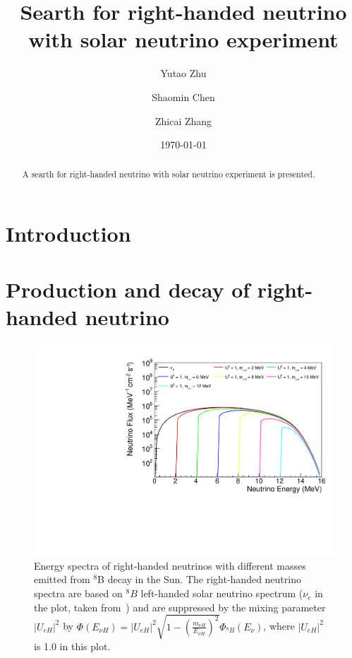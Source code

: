 \documentclass[%
 reprint,
 amsmath,amssymb,
 aps,
 prd,
floatfix,
twocolumn,
]{revtex4-1}
\begin{document}

\title{Searth for right-handed neutrino with solar neutrino experiment}%

\author{Yutao Zhu}
\author{Shaomin Chen}
\author{Zhicai Zhang}%
%

\date{\today}

\begin{abstract}
A searth for right-handed neutrino with solar neutrino experiment is presented.
\end{abstract}

\maketitle

\section{\label{sec:intro}  Introduction }
\section{\label{sec:productionAndDecay} Production and decay of right-handed neutrino }


\begin{figure}[!htbp]
\includegraphics[width=0.99\columnwidth]{../plots/RHNSpectrum_U1.0_AllMass_linXlogY.pdf}
\caption{Energy spectra of right-handed neutrinos with different masses emitted from $^8$B decay in the Sun. The right-handed neutrino spectra are based on $^8B$ left-handed solar neutrino spectrum ($\nu_e$ in the plot, taken from~\cite{bahcall1996B8Spectrum}) and are suppressed by the mixing parameter $|U_{eH}|^2$ by $\Phi(E_{\nu H}) = |U_{eH}|^2\sqrt{1-(\frac{m_{\nu H}}{E_{\nu H}})^2}\Phi_{^8B}(E_{\nu})$, where $|U_{eH}|^2$ is 1.0 in this plot.}
\label{fig:RHNSpectrum} 
\end{figure}
\end{document}
